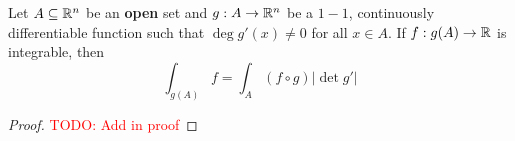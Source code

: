 \begin{theorem}
    Let $A\subseteq\mathbb{R}^n$ be an \textbf{open} set and $g:A\to\mathbb{R}^n$ be a $1-1$, continuously differentiable function such that $\deg g'(x)\ne 0$ for all $x\in A$. If $f:g(A)\to\mathbb{R}$ is integrable, then 
    \begin{equation*}
        \int_{g(A)}f = \int_{A}(f\circ g)|\det g'|
    \end{equation*}
\end{theorem}
\begin{proof}
    \textcolor{red}{TODO: Add in proof}
\end{proof}